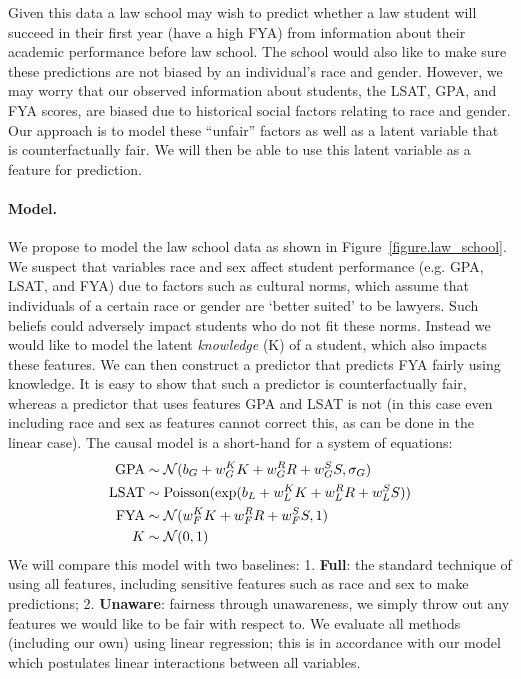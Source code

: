 Given this data a law school may wish to predict whether a law student
will succeed in their first year (have a high FYA) from information about their academic performance 
before law school. The school would also like to make sure
these predictions are not biased by an individual's race and
gender. However, we may worry that our observed information about
students, the LSAT, GPA, and FYA scores, are biased due to historical
social factors relating to race and gender. Our approach is to model these
``unfair'' factors as well as a latent variable that is counterfactually
fair. We will then be able to use this latent variable as a feature
for prediction.

\paragraph{Model.}
We propose to model the law school data as shown in
Figure~\ref{figure.law_school}. We suspect that variables race and sex
affect student performance (e.g. GPA, LSAT, and FYA) due to factors
such as cultural norms, which assume that individuals of a certain
race or gender are `better suited' to be lawyers. Such beliefs could
adversely impact students who do not fit these norms. Instead we would
like to model the latent \emph{knowledge} (K) of a student, which also
impacts these features. We can then construct a predictor that
predicts FYA fairly using knowledge. It is easy to show that such a predictor
is counterfactually fair, whereas a predictor that uses features GPA and
LSAT is not (in this case even including race and sex as
features cannot correct this, as can be done in the linear case). The
causal model is a short-hand for a system of equations:
\begin{align}
\mbox{GPA} &\sim {\cal N}(b_{G} + w_{G}^K K + w_{G}^R R + w_{G}^S S, \sigma_{G}) \nonumber \\
\mbox{LSAT} &\sim \textrm{Poisson}(\exp(b_{L} + w_{L}^K K + w_{L}^R R + w_{L}^S S)) \nonumber \\
\mbox{FYA} &\sim {\cal N}(w_{F}^K K + w_{F}^R R + w_{F}^S S, 1) \nonumber \\
K &\sim {\cal N}(0,1) \nonumber
\end{align}
We will compare this model with two baselines: 1. \textbf{Full}: the standard technique of using all features, including sensitive features such as race and sex to make predictions; 2. \textbf{Unaware}: fairness through unawareness, we simply throw out any features we would like to be fair with respect to. We evaluate all methods (including our own) using linear regression; this is in accordance with our model which postulates linear interactions between all variables. %


